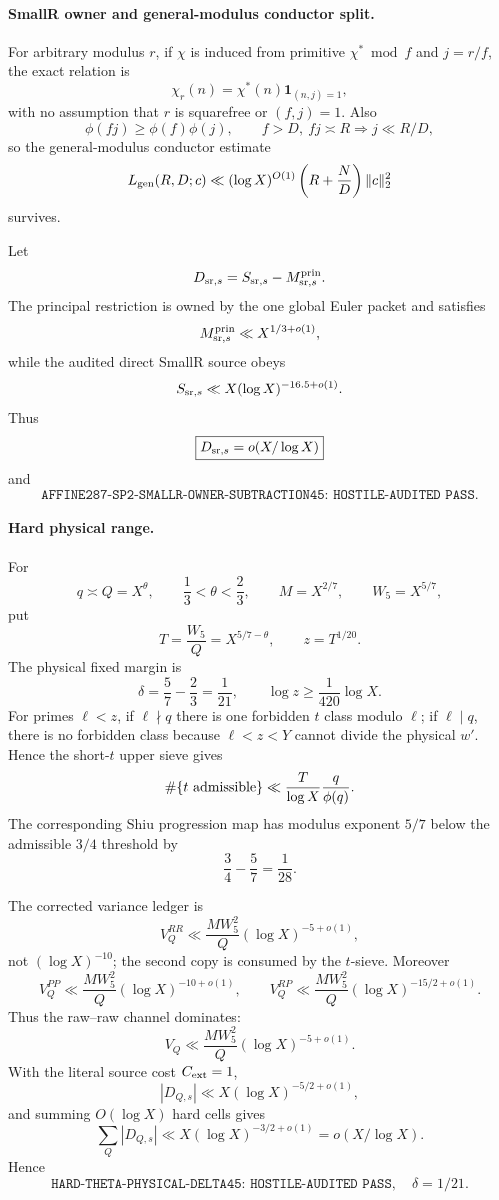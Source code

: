 \documentclass[11pt]{article}
\theoremstyle{definition}
\newcommand{\1}{\mathbf 1}
\begin{document}
\paragraph{SmallR owner and general-modulus conductor split.}
For arbitrary modulus $r$, if $\chi$ is induced from primitive $\chi^\ast\bmod f$ and
$j=r/f$, the exact relation is
\[
\chi_r(n)=\chi^\ast(n)\mathbf1_{(n,j)=1},
\]
with no assumption that $r$ is squarefree or $(f,j)=1$.  Also
\[
\phi(fj)\ge\phi(f)\phi(j),\qquad f>D,\ fj\asymp R\Longrightarrow j\ll R/D,
\]
so the general-modulus conductor estimate
\[
L_{\rm gen}(R,D;c)\ll
(\log X)^{O(1)}
\left(R+\frac ND\right)\|c\|_2^2
\]
survives.

Let
\[
D_{{\rm sr},s}
=
S_{{\rm sr},s}-M_{{\rm sr},s}^{\rm prin}.
\]
The principal restriction is owned by the one global Euler packet and satisfies
\[
M_{{\rm sr},s}^{\rm prin}\ll X^{1/3+o(1)},
\]
while the audited direct SmallR source obeys
\[
S_{{\rm sr},s}\ll X(\log X)^{-16.5+o(1)}.
\]
Thus
\[
\boxed{D_{{\rm sr},s}=o(X/\log X)}
\]
and
\[
\boxed{\texttt{AFFINE287-SP2-SMALLR-OWNER-SUBTRACTION45:
HOSTILE-AUDITED PASS}}.
\]

\paragraph{Hard physical range.}
For
\[
q\asymp Q=X^\theta,\qquad \frac13<\theta<\frac23,
\qquad M=X^{2/7},\qquad W_5=X^{5/7},
\]
put
\[
T=\frac{W_5}{Q}=X^{5/7-\theta},
\qquad z=T^{1/20}.
\]
The physical fixed margin is
\[
\delta=\frac57-\frac23=\frac1{21},
\qquad
\log z\ge\frac1{420}\log X.
\]
For primes $\ell<z$, if $\ell\nmid q$ there is one forbidden $t$ class modulo $\ell$;
if $\ell\mid q$, there is no forbidden class because $\ell<z<Y$ cannot divide the physical
$w'$.  Hence the short-$t$ upper sieve gives
\[
\#\{t\ {\rm admissible}\}
\ll
\frac{T}{\log X}\frac q{\phi(q)}.
\]
The corresponding Shiu progression map has modulus exponent $5/7$ below the admissible
$3/4$ threshold by
\[
\frac34-\frac57=\frac1{28}.
\]

The corrected variance ledger is
\[
V_Q^{RR}\ll
\frac{MW_5^2}{Q}(\log X)^{-5+o(1)},
\]
not $(\log X)^{-10}$; the second copy is consumed by the $t$-sieve.  Moreover
\[
V_Q^{PP}\ll
\frac{MW_5^2}{Q}(\log X)^{-10+o(1)},
\qquad
V_Q^{RP}\ll
\frac{MW_5^2}{Q}(\log X)^{-15/2+o(1)}.
\]
Thus the raw--raw channel dominates:
\[
V_Q\ll\frac{MW_5^2}{Q}(\log X)^{-5+o(1)}.
\]
With the literal source cost $C_{\rm ext}=1$,
\[
|D_{Q,s}|
\ll
X(\log X)^{-5/2+o(1)},
\]
and summing $O(\log X)$ hard cells gives
\[
\boxed{
\sum_Q|D_{Q,s}|
\ll
X(\log X)^{-3/2+o(1)}
=o(X/\log X).
}
\]
Hence
\[
\boxed{\texttt{HARD-THETA-PHYSICAL-DELTA45:
HOSTILE-AUDITED PASS},\quad\delta=1/21.}
\]
\end{document}
